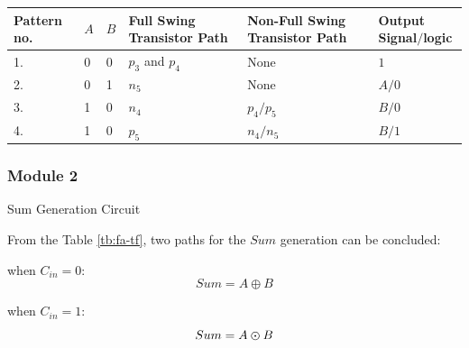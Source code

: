 \documentclass[conference]{IEEEtran}
\begin{document}
\begin{table}[!htb]
\begin{tabular}{p{1.5cm}p{1.5cm}p{1.5cm}p{4cm}p{4cm}l}
		Pattern no.                           & \(A\)                                                  & \(B\)                                  & Full Swing Transistor Path & Non-Full Swing Transistor Path & Output Signal\(/\)logic \\
		\hline
		1.                                    & 0                                                      & 0                                      & \(p_3\) and \(p_4\)        & None                           & \(1\)                   \\
		2.                                    & 0                                                      & 1                                      & \(n_5\)                    & None                           & \(A/0\)                 \\
		3.                                    & 1                                                      & 0                                      & \(n_4\)                    & \(p_4/p_5\)                    & \(B/0\)                 \\
		4.                                    & 1                                                      & 0                                      & \(p_5\)                    & \(n_4/n_5\)                    & \(B/1\)                 \\
		\hline
	\end{tabular}
	\label{tb:xor-xnor}
\end{table}

\subsubsection{Module 2}Sum Generation Circuit

From the Table \ref{tb:fa-tf}, two paths for the \(Sum\) generation can be concluded:

when \(C_{in} = 0\):
\[
	Sum = A \oplus B
\]

when \(C_{in} = 1\):
\[
	Sum = A \varodot B
\]
\end{document}
